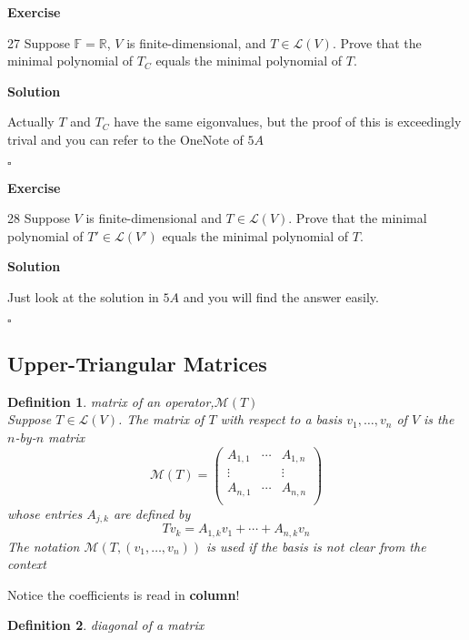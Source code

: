 \documentclass{article}
\newtheorem{definition}{Definition}[subsection]
\newenvironment{exercise}{%
{\textbf{Exercise\\}
    }
}{
}
\newenvironment{solution}{%
{
    \textbf{Solution\\}
    }
}{
  \hfill $\square$ 
  \par\bigskip 
}
\newcommand{\RR}{\mathbb{R}}
\newcommand{\FF}{\mathbb{F}}
\begin{document}
\begin{CJK}{UTF8}{gkai}
\begin{exercise}
    27 Suppose $\FF = \RR$, $V$  is finite-dimensional, and $T \in \mathcal{L}(V)$. Prove that the minimal polynomial of $T_C$ equals the minimal polynomial of $T$.

\end{exercise}

\begin{solution}
    Actually $T$ and $T_C$ have the same eigonvalues, but the proof of this is exceedingly trival and you can refer to the OneNote of $5A$
\end{solution}

\begin{exercise}
    28 Suppose $V$ is finite-dimensional and $T \in \mathcal{L}(V)$. Prove that the minimal polynomial of $T' \in \mathcal{L}(V ')$ equals the minimal polynomial of $T$.
\end{exercise}

\begin{solution}
    Just look at the solution in $5A$ and you will find the answer easily.
\end{solution}



\subsection{Upper-Triangular Matrices}

\begin{definition}
    matrix of an operator,$\mathcal{M}(T)$\\

 Suppose $T \in\mathcal{L}(V)$. The matrix of $T$ with respect to a basis $v_1,\ldots,v_n$ of $V$ is the $n$-by-$n$ matrix
    \[\mathcal{M}(T) = \begin{pmatrix}
        A_{1,1}&\cdots&A_{1,n}\\
        \vdots&&\vdots\\
        A_{n,1}&\cdots&A_{n,n}\\
    \end{pmatrix}\]
    whose entries $A_{j,k}$ are defined by
    \[Tv_k=A_{1,k}v_1+\cdots+A_{n,k}v_n\]
    The notation $\mathcal{M}(T,(v_1,\ldots,v_n))$ is used if the basis is not clear from the context
\end{definition}
Notice the coefficients is read in \textbf{column}!

\begin{definition}
    diagonal of a matrix\\


\end{definition}
\end{CJK}
\end{document}
